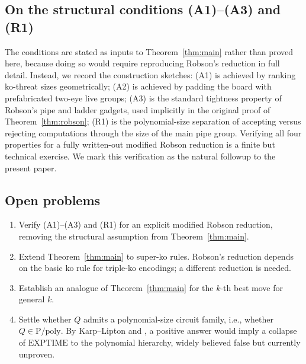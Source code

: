 \documentclass[11pt,a4paper]{amsart}
\theoremstyle{plain}
\theoremstyle{definition}
\theoremstyle{remark}
\newcommand{\EXPTIME}{\mathrm{EXPTIME}}
\begin{document}
\subsection{On the structural conditions (A1)--(A3) and (R1)}

The conditions are stated as inputs to Theorem~\ref{thm:main} rather
than proved here, because doing so would require reproducing Robson's
reduction in full detail. Instead, we record the construction sketches:
(A1) is achieved by ranking ko-threat sizes geometrically; (A2) is
achieved by padding the board with prefabricated two-eye live groups;
(A3) is the standard tightness property of Robson's pipe and ladder
gadgets, used implicitly in the original proof of
Theorem~\ref{thm:robson}; (R1) is the polynomial-size separation of
accepting versus rejecting computations through the size of the
main pipe group. Verifying all four properties for a fully written-out
modified Robson reduction is a finite but technical exercise. We mark
this verification as the natural followup to the present paper.

\subsection{Open problems}

\begin{enumerate}[nosep]
  \item Verify (A1)--(A3) and (R1) for an explicit modified Robson
        reduction, removing the structural assumption from
        Theorem~\ref{thm:main}.
  \item Extend Theorem~\ref{thm:main} to super-ko rules. Robson's
        reduction depends on the basic ko rule for triple-ko encodings;
        a different reduction is needed.
  \item Establish an analogue of Theorem~\ref{thm:main} for the $k$-th
        best move for general $k$.
  \item Settle whether $Q$ admits a polynomial-size circuit family,
        i.e., whether $Q \in \mathrm{P}/\mathrm{poly}$. By Karp--Lipton
        \cite{KL80} and \cite{BFT98}, a positive answer would imply
        a collapse of $\EXPTIME$ to the polynomial hierarchy, widely
        believed false but currently unproven.
\end{enumerate}
\end{document}
